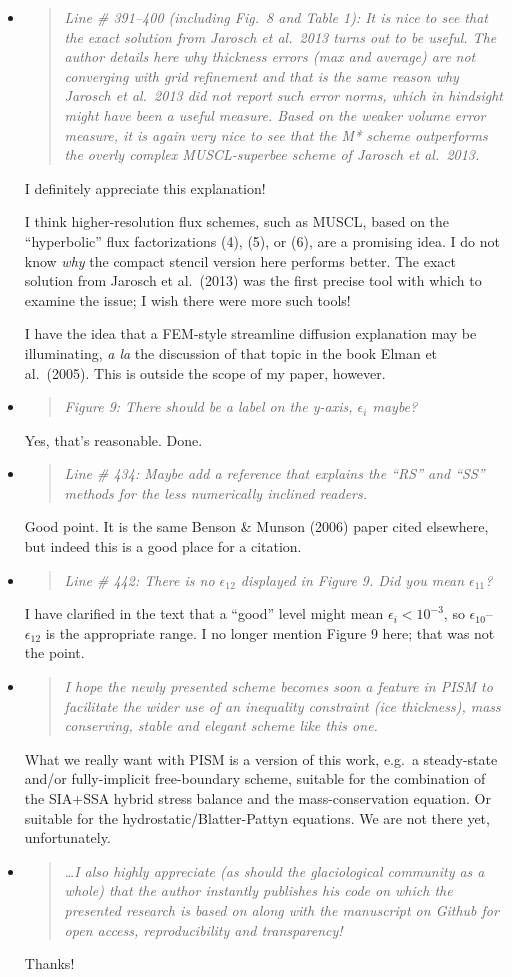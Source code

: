 \documentclass[11pt,reqno]{amsart}
\newcommand{\reply}[2]{
\medskip\medskip
\item  \begin{quote}
\emph{#1}
\end{quote}

\medskip
\noindent #2}
\begin{document}
\begin{itemize}
\reply{Line \# 391--400 (including Fig.~8 and Table 1): It is nice to see that the exact solution from Jarosch et al.~2013 turns out to be useful.  The author details here why thickness errors (max and average) are not converging with grid refinement and that is the same reason why Jarosch et al.~2013 did not report such error norms, which in hindsight might have been a useful measure.  Based on the weaker volume error measure, it is again very nice to see that the M* scheme outperforms the overly complex MUSCL-superbee scheme of Jarosch et al.~2013.}
{I definitely appreciate this explanation!

I think higher-resolution flux schemes, such as MUSCL, based on the ``hyperbolic'' flux factorizations (4), (5), or (6), are a promising idea.  I do not know \emph{why} the compact stencil version here performs better.  The exact solution from Jarosch et al.~(2013) was the first precise tool with which to examine the issue; I wish there were more such tools!

I have the idea that a FEM-style streamline diffusion explanation may be illuminating, \emph{a la} the discussion of that topic in the book Elman et al.~(2005).  This is outside the scope of my paper, however.}

\reply{Figure 9: There should be a label on the y-axis, $\epsilon_i$ maybe?}
{Yes, that's reasonable.  Done.}

\reply{Line \# 434: Maybe add a reference that explains the ``RS'' and ``SS'' methods for the less numerically inclined readers.}
{Good point.  It is the same Benson \& Munson (2006) paper cited elsewhere, but indeed this is a good place for a citation.}

\reply{Line \# 442: There is no $\epsilon_{12}$ displayed in Figure 9.  Did you mean $\epsilon_{11}$?}
{I have clarified in the text that a ``good'' level might mean $\epsilon_i<10^{-3}$, so $\epsilon_{10}$--$\epsilon_{12}$ is the appropriate range.  I no longer mention Figure 9 here; that was not the point.}

\reply{I hope the newly presented scheme becomes soon a feature in PISM to facilitate the wider use of an inequality constraint (ice thickness), mass conserving, stable and elegant scheme like this one.}
{What we really want with PISM is a version of this work, e.g.~a steady-state and/or fully-implicit free-boundary scheme, suitable for the combination of the SIA+SSA hybrid stress balance and the mass-conservation equation.  Or suitable for the hydrostatic/Blatter-Pattyn equations.  We are not there yet, unfortunately.}

\reply{\dots  I also highly appreciate (as should the glaciological community as a whole) that the author instantly publishes his code on which the presented research is based on along with the manuscript on Github for open access, reproducibility and transparency!}
{Thanks!}
\end{itemize}
\end{document}
